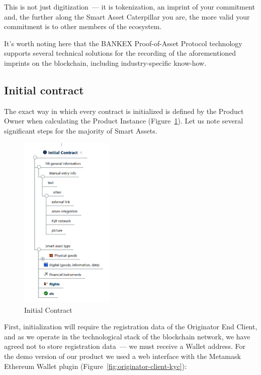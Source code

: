 \documentclass{article}
\begin{document}
\begin{multicols}{2}
This is not just digitization~--- it is tokenization, an imprint of your commitment and, the further along the Smart Asset Caterpillar you are, the more valid your commitment is to other members of the ecosystem.

It's worth noting here that the BANKEX Proof-of-Asset Protocol technology supports several technical solutions for the recording of the aforementioned imprints on the blockchain, including industry-specific know-how. 

\subsection{Initial contract}

The exact way in which every contract is initialized is defined by the Product Owner when calculating the Product Instance (Figure~\ref{fig:initial-contract}). Let us note several significant steps for the majority of Smart Assets.

\begin{figure}
  \centering
  \includegraphics[width=0.4\textwidth]{initial-contract.png}
  \caption{Initial Contract}
  \label{fig:initial-contract}
\end{figure}

First, initialization will require the registration data of the Originator End Client, and as we operate in the technological stack of the blockchain network, we have agreed not to store registration data~--- we must receive a Wallet address. For the demo version of our product we used a web interface with the Metamask Ethereum Wallet plugin (Figure~\ref{fig:originator-client-kyc}):


\end{multicols}
\end{document}
